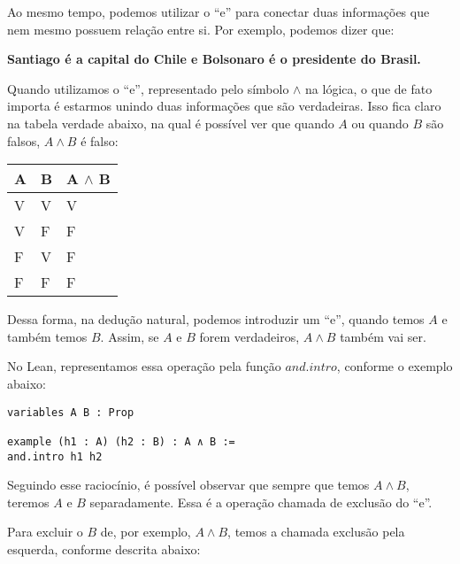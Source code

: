Ao mesmo tempo, podemos utilizar o ``e'' para conectar duas informações que nem mesmo possuem relação entre si. Por exemplo, podemos dizer que:
\begin{center}
\textbf{Santiago é a capital do Chile e Bolsonaro é o presidente do Brasil.}
\end{center}
Quando utilizamos o ``e'', representado pelo símbolo $\land$ na lógica, o que de fato importa é estarmos unindo duas informações que são verdadeiras. Isso fica claro na tabela verdade abaixo, na qual é possível ver que quando $A$ ou quando $B$ são falsos, $A\land B$ é falso:

\begin{table}[htb]
\centering
\begin{tabular}{|l|l|l|}
\hline
\textbf{A} & \textbf{B} & \textbf{A $\land$ B} \\ \hline
V          & V          & V                  \\ \hline
V          & F          & F                  \\ \hline
F          & V          & F                  \\ \hline
F          & F          & F                  \\ \hline
\end{tabular}
\end{table}

Dessa forma, na dedução natural, podemos introduzir um ``e'', quando temos $A$ e também temos $B$. Assim, se $A$ e $B$ forem verdadeiros, $A \land B$ também vai ser. 

 \begin{prooftree}
\end{prooftree}

No Lean, representamos essa operação pela função $and.intro$, conforme o exemplo abaixo:
\vspace{5mm}
\begin{lstlisting} 
variables A B : Prop

example (h1 : A) (h2 : B) : A ∧ B :=
and.intro h1 h2
\end{lstlisting}
\vspace{5mm}

Seguindo esse raciocínio, é possível observar que sempre que temos $A \land B$, teremos $A$ e $B$ separadamente. Essa é a operação chamada de exclusão do ``e''.

Para excluir o $B$ de, por exemplo, $A \land B$, temos a chamada exclusão pela esquerda, conforme descrita abaixo:

